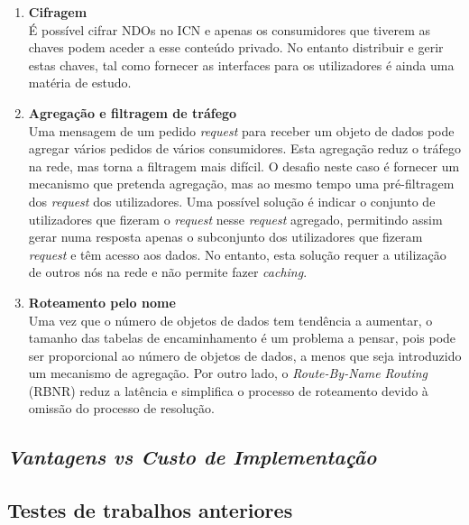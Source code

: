 \documentclass[conference]{IEEEtran}
\begin{document}
\begin{enumerate}
\item \textbf{Cifragem}\\

É poss\'{i}vel cifrar NDOs no ICN e apenas os consumidores que tiverem as chaves podem aceder a esse conte\'{u}do privado. No entanto distribuir e gerir estas chaves, tal como fornecer as interfaces para os utilizadores \'{e} ainda uma mat\'{e}ria de estudo.\\

\item \textbf{Agrega\c{c}\~{a}o e filtragem de tr\'{a}fego}\\

Uma mensagem de um pedido \textit{request} para receber um objeto de dados pode agregar v\'{a}rios pedidos de v\'{a}rios consumidores. Esta agrega\c{c}\~{a}o reduz o tr\'{a}fego na rede, mas torna a filtragem mais dif\'{i}cil. O desafio neste caso \'{e} fornecer um mecanismo que pretenda agrega\c{c}\~{a}o, mas ao mesmo tempo uma pr\'{e}-filtragem dos \textit{request} dos utilizadores. Uma poss\'{i}vel solu\c{c}\~{a}o \'{e} indicar o conjunto de utilizadores que fizeram o \textit{request} nesse \textit{request} agregado, permitindo assim gerar numa resposta apenas o subconjunto dos utilizadores que fizeram \textit{request} e t\^{e}m acesso aos dados. No entanto, esta solu\c{c}\~{a}o requer a utiliza\c{c}\~{a}o de outros n\'{o}s na rede e n\~{a}o permite fazer \textit{caching}.\\

\item \textbf{Roteamento pelo nome}\\

Uma vez que o n\'{u}mero de objetos de dados tem tend\^{e}ncia a aumentar, o tamanho das tabelas de encaminhamento \'{e} um problema a pensar, pois pode ser proporcional ao n\'{u}mero de objetos de dados, a menos que seja introduzido um mecanismo de agrega\c{c}\~{a}o. Por outro lado, o \textit{Route-By-Name Routing} (RBNR) reduz a lat\^{e}ncia e simplifica o processo de roteamento devido \`{a} omiss\~{a}o do processo de resolu\c{c}\~{a}o.\\
\end{enumerate}


\subsection{\textit{Vantagens vs Custo de Implementa\c{c}\~{a}o}}

\subsection{Testes de trabalhos anteriores}
\end{document}
